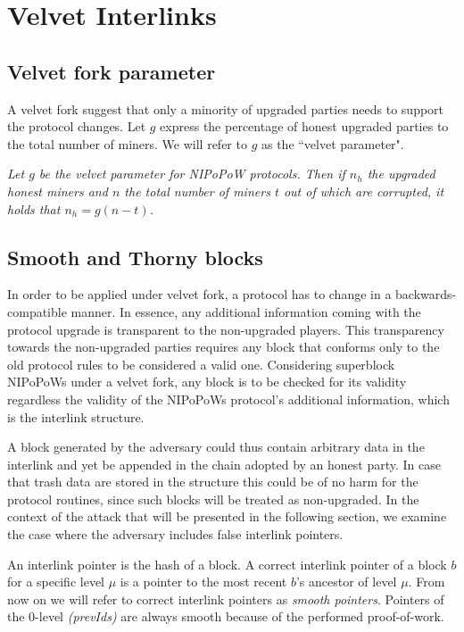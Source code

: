 \section{Velvet Interlinks}
\subsection{Velvet fork parameter}
A velvet fork suggest that only a minority of upgraded parties needs to support the protocol changes. Let $g$ express the percentage of honest upgraded parties to the total number of miners. We will refer to $g$ as the ``velvet parameter".

\begin{definition}
	\textit{Let $g$ be the velvet parameter for NIPoPoW protocols. Then if $n_h$ the upgraded honest miners and $n$ the total number of miners $t$ out of which are corrupted, it holds that $n_h = g (n - t)$.}
	\label{defn:velvet_honest_majority}
\end{definition}

\subsection{Smooth and Thorny blocks}
In order to be applied under velvet fork, a protocol has to change in a backwards-compatible manner. In essence, any additional information coming with the protocol upgrade is transparent to the non-upgraded players. This transparency towards the non-upgraded parties requires any block that conforms only to the old protocol rules to be considered a valid one. Considering superblock NIPoPoWs under a velvet fork, any block is to be checked for its validity regardless the validity of the NIPoPoWs protocol's additional information, which is the interlink structure.

A block generated by the adversary could thus contain arbitrary data in the interlink and yet be appended in the chain adopted by an honest party. In case that trash data are stored in the structure this could be of no harm for the protocol routines, since such blocks will be treated as non-upgraded. In the context of the attack that will be presented in the following section, we examine the case where the adversary includes false interlink pointers. 

An interlink pointer is the hash of a block. A correct interlink pointer of a block $b$ for a specific level $\mu$ is a pointer to the most recent $b$'s ancestor of level $\mu$. From now on we will refer to correct interlink pointers as \emph{smooth pointers}. Pointers of the 0-level \textit{(prevIds)} are always smooth because of the performed proof-of-work.

